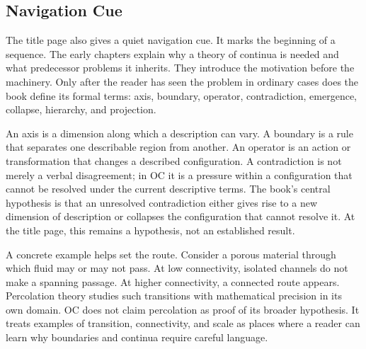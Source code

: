 \documentclass[11pt,a4paper,openany]{book}
\begin{document}
\subsection{Navigation Cue}
The title page also gives a quiet navigation cue. It marks the beginning of a sequence. The early chapters explain why a theory of continua is needed and what predecessor problems it inherits. They introduce the motivation before the machinery. Only after the reader has seen the problem in ordinary cases does the book define its formal terms: axis, boundary, operator, contradiction, emergence, collapse, hierarchy, and projection. \cite{stauffer_percolation,grimmett_percolation}\par
An axis is a dimension along which a description can vary. A boundary is a rule that separates one describable region from another. An operator is an action or transformation that changes a described configuration. A contradiction is not merely a verbal disagreement; in OC it is a pressure within a configuration that cannot be resolved under the current descriptive terms. The book's central hypothesis is that an unresolved contradiction either gives rise to a new dimension of description or collapses the configuration that cannot resolve it. At the title page, this remains a hypothesis, not an established result.\par
A concrete example helps set the route. Consider a porous material through which fluid may or may not pass. At low connectivity, isolated channels do not make a spanning passage. At higher connectivity, a connected route appears. Percolation theory studies such transitions with mathematical precision in its own domain. OC does not claim percolation as proof of its broader hypothesis. It treats examples of transition, connectivity, and scale as places where a reader can learn why boundaries and continua require careful language.\par
\end{document}
